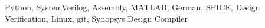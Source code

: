 

\begin{cvhonors}

  \cvhonor
    {Python, SystemVerilog, Assembly, MATLAB, German, SPICE, Design Verification, Linux, git, Synopsys Design Compiler} %
    {}
    {}
    {}

\end{cvhonors}
